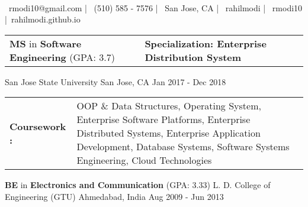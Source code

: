 \documentclass[]{awesome-cv}
\begin{document}
\begin{center}
	  \\
	\vspace{1mm}
	{\faEnvelope\ rmodi10@gmail.com} | {\faMobile\ (510) 585 - 7576} | {\faMapMarker\ San Jose, CA} | {\faGithub\ rahilmodi} | {\faLinkedin\ rmodi10} |{\faLink\ rahilmodi.github.io}
\end{center}
\begin{cventries}
	\cventry
	{
	\begin{tabular}{ l l }
        \textbf{MS} in \textbf{Software Engineering} (GPA: 3.7)\hspace{2cm} & \textbf{Specialization: Enterprise Distribution System} \\ 
    \end{tabular}
    }
	{San Jose State University}
	{San Jose, CA}
	{Jan 2017 - Dec 2018}
	{
	\begin{cvcoursework}
	\vspace{2mm}
	\begin{tabular}{  m{6em}  m{16cm} } 
    \textbf{Coursework : }& {OOP \& Data Structures, Operating System, Enterprise Software Platforms, Enterprise Distributed Systems, Enterprise Application Development, Database Systems, Software Systems Engineering, Cloud Technologies} \\ 
    \end{tabular}
    \end{cvcoursework}
	}
	{}
	\cventry
	{
        \textbf{BE} in \textbf{Electronics and Communication} (GPA: 3.33) 
    }
	{L. D. College of Engineering (GTU)}
	{Ahmedabad, India}
	{Aug 2009 - Jun 2013}
	{}
\end{cventries}
\end{document}
